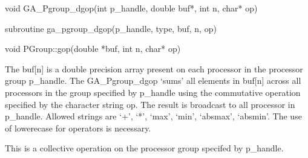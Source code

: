 \documentclass[12pt]{article}
\begin{document}

\begin{capi}
\begin{ccode}
void GA_Pgroup_dgop(int p_handle, double buf*, int n, char* op)
\end{ccode}
\begin{funcargs}
\end{funcargs}
\end{capi}

\begin{fapi}
\begin{fcode}
subroutine ga_pgroup_dgop(p_handle, type, buf, n, op)
\end{fcode}
\begin{funcargs}
\end{funcargs}
\end{fapi}

\begin{cxxapi}
\begin{cxxcode}
void PGroup::gop(double *buf, int n, char* op)
\end{cxxcode}
\begin{funcargs}
\end{funcargs}
\end{cxxapi}
\gcoll
\begin{desc}

The buf[n] is a double precision array present on each processor in the processor group p_handle. The GA_Pgroup_dgop `sums' all elements in buf[n] across all processors in the group specified by p_handle using the commutative operation specified by the character string op.  The result is broadcast to all processor in p_handle. Allowed strings are `+', `*', `max', `min', `absmax', `absmin'. The use of lowerecase for operators is necessary.

This is a collective operation on the processor group specifed by p_handle. 
\end{desc}
\end{document}
